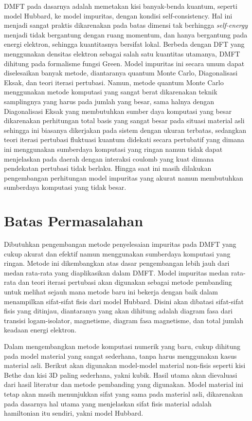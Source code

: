DMFT pada dasarnya adalah memetakan kisi banyak-benda kuantum, seperti model Hubbard, ke model impuritas, dengan kondisi self-consistency. Hal ini menjadi sangat praktis dikarenakan pada batas dimensi tak berhingga \textit{self-energy} menjadi tidak bergantung dengan ruang momentum, dan hanya bergantung pada energi elektron, sehingga kuantitasnya bersifat lokal. Berbeda dengan DFT yang menggunakan densitas elektron sebagai salah satu kuantitas utamanya, DMFT dihitung pada formalisme fungsi Green. Model impuritas ini secara umum dapat diselesaikan banyak metode, diantaranya quantum Monte Carlo, Diagonalisasi Eksak, dan teori iterasi pertubasi. Namun, metode quantum Monte Carlo menggunakan metode komputasi yang sangat berat dikarenakan teknik samplingnya yang harus pada jumlah yang besar, sama halnya dengan Diagonalisasi Eksak yang membutuhkan sumber daya komputasi yang besar dikarenakan perhitungan total basis yang sangat besar pada situasi material asli sehingga ini biasanya dikerjakan pada sistem dengan ukuran terbatas, sedangkan teori iterasi pertubasi fluktuasi kuantum didekati secara pertubatif yang dimana ini menggunakan sumberdaya komputasi yang ringan namun tidak dapat menjelaskan pada daerah dengan interaksi coulomb yang kuat dimana pendekatan pertubasi tidak berlaku. Hingga saat ini masih dilakukan pengembangan perhitungan model impuritas yang akurat namun membutuhkan sumberdaya komputasi yang tidak besar.


\section{Batas Permasalahan}
Dibutuhkan pengembangan metode penyelesaian impuritas pada DMFT yang cukup akurat dan efektif namun menggunakan sumberdaya komputasi yang ringan. Metode ini dikembangkan atas dasar pengembangan lebih jauh dari medan rata-rata yang diaplikasikan dalam DMFT. Model impuritas medan rata-rata dan teori iterasi pertubasi akan digunakan sebagai metode pembanding untuk melihat sejauh mana metode baru ini bekerja dengan baik dalam menampilkan sifat-sifat fisis dari model Hubbard. Disini akan dibatasi sifat-sifat fisis yang ditinjau, diantaranya yang akan dihitung adalah diagram fasa dari transisi logam-isolator, magnetisme, diagram fasa magnetisme, dan total jumlah keadaan energi elektron.

Dalam mengembangkan metode komputasi numerik yang baru, cukup dihitung pada model material yang sangat sederhana, tanpa harus menggunakan kasus material asli. Berikut akan digunakan model-model material non-fisis seperti kisi Bethe dan kisi 3D paling sederhana, yakni kubik. Hasil utama akan dievaluasi dari hasil literatur dan metode pembanding yang digunakan. Model material ini tetap akan masih menunjukkan sifat yang sama pada material asli, dikarenakan pada dasarnya hal utama yang menjelaskan sifat fisis material adalah hamiltonian itu sendiri, yakni model Hubbard.

